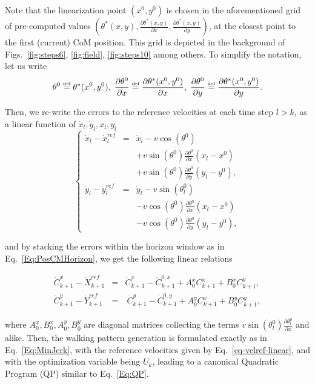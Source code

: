 Note that the linearization point $(x^0,y^0)$ is chosen in the aforementioned grid of pre-computed values $(\theta^*(x,y),\frac{\partial \theta^*(x,y)}{\partial x},  \frac{\partial \theta^*(x,y)}{\partial y})$, at the closest point to the first (current) CoM position. This grid is depicted in the background of Figs.~\ref{fig:steps6}, \ref{fig:field}, \ref{fig:steps10} among others. To simplify the notation, let us write
$$
\theta^0 \stackrel{\mbox{\tiny def}}{=}  \theta^*(x^0,y^0),\;
\frac{\partial \theta^0}{\partial x} \stackrel{\mbox{\tiny def}}{=} \frac{\partial \theta^*(x^0,y^0)}{\partial x},\;
\frac{\partial \theta^0}{\partial y} \stackrel{\mbox{\tiny def}}{=}  \frac{\partial \theta^*(x^0,y^0)}{\partial y}. 
$$


Then, we re-write the errors to the reference velocities at each time step $l>k$, as a linear function of $\dot{x}_l,\dot{y}_l,x_l,y_l$
$$
\left\{
\begin{array}{ccc}
\dot{x}_l-\dot{x}^{ref}_l & = & \dot{x}_l - v\cos(\theta^0)\\
&& + v\sin(\theta^0) \frac{\partial \theta^0}{\partial x}  (x_l-x^0)\\
&& + v\sin(\theta^0) \frac{\partial \theta^0}{\partial y}  (y_l-y^0),\\
\dot{y}_l-\dot{y}^{ref}_l & = & \dot{y}_l - v\sin(\theta^0_l)\\
&& - v\cos(\theta^0) \frac{\partial \theta^0}{\partial x}  (x_l-x^0)\\
&& - v\cos(\theta^0) \frac{\partial \theta^0}{\partial y}  (y_l-y^0),
\end{array}
\right.
$$ 

and by stacking the errors within the horizon window as in Eq.~\ref{Eq:PosCMHorizon}, we get the following 
linear relations

{\small
\begin{eqnarray}
\nonumber
 \dot{C}_{k+1}^{x}  - \dot{X}_{k+1}^{ref} & = &    \dot{C}_{k+1}^{x} -   \dot{C}_{k+1}^{0,x}  + A^x_{0} C_{k+1}^{x}  + B^x_{0} C_{k+1}^{y},\\
 \dot{C}_{k+1}^{y} - \dot{Y}_{k+1}^{ref} & = &   \ \dot{C}_{k+1}^{y} - \dot{C}_{k+1}^{0,y} + A^y_{0} C_{k+1}^{x} + B^y_{0}  C_{k+1}^{y},
 \label{eq-velref-linear}
 \end{eqnarray}}

where $A^x_{0},B^x_{0},A^y_{0},B^y_{0}$ are diagonal matrices collecting the terms $v\sin(\theta^0_l) \frac{\partial \theta^0_l}{\partial x}$ and alike. Then, the walking pattern generation is formulated exactly as in Eq.~\ref{Eq:MinJerk}, with the reference velocities given by Eq.~\ref{eq-velref-linear}, and with the optimization variable being $U_{k}$,
leading to a canonical Quadratic Program (QP) similar to Eq.~\ref{Eq:QP}.

